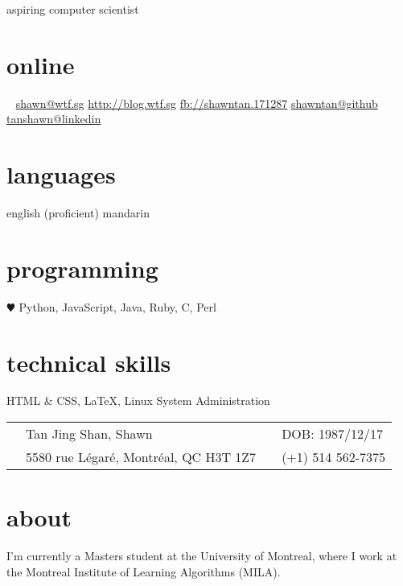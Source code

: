 \documentclass[]{friggeri-cv}
\begin{document}
{aspiring computer scientist

}

\begin{aside}
	\section{online}
	\Email~ \href{mailto:shawn@wtf.sg}{shawn@wtf.sg}
	\href{https://blog.wtf.sg}{http://blog.wtf.sg}
	\href{http://facebook.com/shawntan.171287}{fb://shawntan.171287}
	\href{http://github.com/shawntan}{shawntan@github}
	\href{http://sg.linkedin.com/in/tanshawn}{tanshawn@linkedin}
	\section{languages}
	english (proficient)
	mandarin
	\section{programming}
	{\color{red} $\varheartsuit$} Python, JavaScript, Java, Ruby, C, Perl
	\section{technical skills}
	HTML \& CSS, \LaTeX,
	Linux System Administration
\end{aside}
\begin{tabular}{ p{0.45cm} p{8cm} p{0.45cm} p{6.5cm} }
	\Male 	& Tan Jing Shan, Shawn	 & \Sagittarius &  DOB: 1987/12/17\\
	\Letter & 5580 rue L\'{e}gar\'{e}, Montr\'{e}al, QC H3T 1Z7 & \Mobilefone & 
	(+1) 514 562-7375\\
\end{tabular}


\section{about}
I'm currently a Masters student at the University of Montreal, where I work at 
the Montreal Institute of Learning Algorithms (MILA). \iftoggle{short}{}{I enjoy 
working on machine learning projects, and keeping up with the latest in neural 
networks research. I maintain a \href{http://blog.wtf.sg}{blog} where I write 
about my machine learning projects.}
\iftoggle{short}{}%
{

\section{research interests}
artificial intelligence, recurrent neural networks, machine learning,\\
reinforcement learning, graphical models, natural language processing, data 
mining
}
\end{document}
